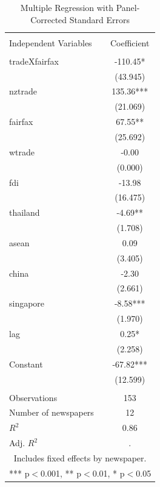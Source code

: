 \documentclass[12pt]{report}
\begin{document}
\begin{center}
\begin{table}
\caption{Multiple Regression with Panel-Corrected Standard Errors}
\begin{center}
{\footnotesize
\begin{tabular}{lc} \hline  &  \\ Independent Variables & Coefficient \\
\hline  &  \\ tradeXfairfax & -110.45* \\
 & (43.945) \\ nztrade & 135.36*** \\ 
& (21.069) \\ fairfax & 67.55** \\  &
(25.692) \\ wtrade & -0.00 \\  &
(0.000) \\ fdi & -13.98 \\  &
(16.475) \\ thailand & -4.69** \\  &
(1.708) \\ asean & 0.09 \\  &
(3.405) \\ china & -2.30 \\  &
(2.661) \\ singapore & -8.58*** \\  &
(1.970) \\ lag & 0.25* \\  &
(2.258) \\ Constant & -67.82*** \\  &
(12.599) \\  &
 \\ Observations & 153 \\ Number of newspapers & 12 \\ $R^2$ &
0.86 \\  Adj. $R^2$ & . \\ \hline \multicolumn{2}{c}{ Includes fixed effects by
newspaper. } \\ \multicolumn{2}{c}{ *** p$<$0.001, **
p$<$0.01, * p$<$0.05} \\
\end{tabular}
}
\end{center}
\label{default}
\end{table}
\end{center}
\end{document}
